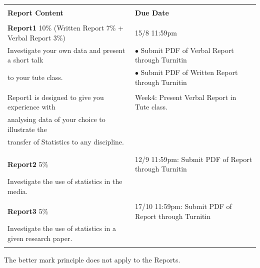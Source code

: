 \documentclass[bigtut]{quiz}\usepackage[]{graphicx}\usepackage[]{color}
\begin{document}
\begin{tutorial}
{\small \begin{tabular}{|l|l|} \hline  
& \\ 
 {\bf Report Content} \hspace{1cm} & {\bf Due Date}  \\  [2ex]  \hline 
 & \\ 
{\bf Report1}  10\%   \hspace{.1cm} (Written Report 7\% + Verbal Report 3\%) & 15/8 11:59pm   \\
Investigate your own data and present a short talk  & $\bullet$ Submit PDF of Verbal Report through Turnitin      \\
to your tute class. & $\bullet$ Submit PDF of Written Report through Turnitin    \\
&     \\
Report1 is designed to give you experience with    & Week4: Present Verbal Report in Tute class.       \\ 
analysing data of your choice to illustrate the    &      \\ 
transfer of Statistics to any discipline. &   \\
&      \\  [2ex]  \hline 
 & \\  
 {\bf Report2} 5\% & 12/9 11:59pm: Submit PDF of  Report through Turnitin \\  
 Investigate the use of statistics in the media.  &    \\ [2ex]   \hline 
 & \\  
 {\bf Report3} 5\% & 17/10 11:59pm: Submit PDF of  Report through Turnitin \\ 
Investigate the use of statistics in a given research paper.  &    \\
  & \\   [2ex]   \hline 
\end{tabular} }

The better mark principle does not apply to the Reports. \\


\end{tutorial}
\end{document}
